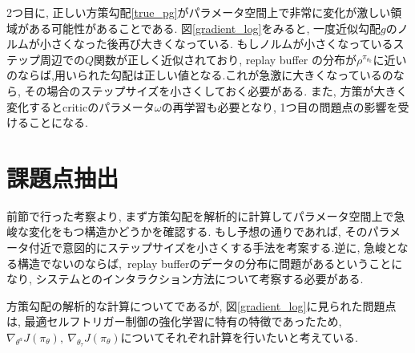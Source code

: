 \documentclass{jsarticle}
\begin{document}
2つ目に, 正しい方策勾配\eqref{true_pg}がパラメータ空間上で非常に変化が激しい領域がある可能性があることである. 図\ref{gradient_log}をみると, 一度近似勾配$g$のノルムが小さくなった後再び大きくなっている. もしノルムが小さくなっているステップ周辺での$Q$関数が正しく近似されており, replay buffer の分布が$\rho^{\pi_{\theta_k}}$に近いのならば,用いられた勾配は正しい値となる.これが急激に大きくなっているのなら, その場合のステップサイズを小さくしておく必要がある. また, 方策が大きく変化するとcriticのパラメータ$\omega$の再学習も必要となり, 1つ目の問題点の影響を受けることになる.\par

\section{課題点抽出}
前節で行った考察より, まず方策勾配を解析的に計算してパラメータ空間上で急峻な変化をもつ構造かどうかを確認する. もし予想の通りであれば, そのパラメータ付近で意図的にステップサイズを小さくする手法を考案する.逆に, 急峻となる構造でないのならば,~replay bufferのデータの分布に問題があるということになり, システムとのインタラクション方法について考察する必要がある.\par
方策勾配の解析的な計算についてであるが, 図\ref{gradient_log}に見られた問題点は, 最適セルフトリガー制御の強化学習に特有の特徴であったため,~$\nabla_{\theta^a}J(\pi_{\theta}),~\nabla_{\theta_{\tau}}J(\pi_{\theta})$についてそれぞれ計算を行いたいと考えている. \par
\end{document}
